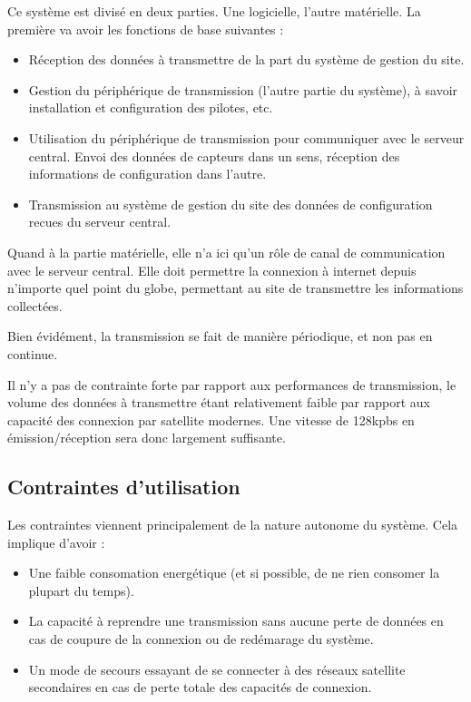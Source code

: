 Ce système est divisé en deux parties. Une logicielle, l'autre matérielle. La première va avoir les fonctions de base suivantes :

\begin{itemize}
\item Réception des données à transmettre de la part du système de gestion du site.
\item Gestion du périphérique de transmission (l'autre partie du système), à savoir installation et configuration des pilotes, etc.
\item Utilisation du périphérique de transmission pour communiquer avec le serveur central. Envoi des données de capteurs dans un sens, réception des informations de configuration dans l'autre.
\item Transmission au système de gestion du site des données de configuration recues du serveur central.
\end{itemize}

Quand à la partie matérielle, elle n'a ici qu'un rôle de canal de communication avec le serveur central. Elle doit permettre la connexion à internet depuis n'importe quel point du globe, permettant au site de transmettre les informations collectées.

Bien évidément, la transmission se fait de manière périodique, et non pas en continue.

Il n'y a pas de contrainte forte par rapport aux performances de transmission, le volume des données à transmettre étant relativement faible par rapport aux capacité des connexion par satellite modernes. Une vitesse de 128kpbs en émission/réception sera donc largement suffisante.

\subsection{Contraintes d'utilisation}

Les contraintes viennent principalement de la nature autonome du système. Cela implique d'avoir :

\begin{itemize}
\item Une faible consomation energétique (et si possible, de ne rien consomer la plupart du temps).
\item La capacité à reprendre une transmission sans aucune perte de données en cas de coupure de la connexion ou de redémarage du système.
\item Un mode de secours essayant de se connecter à des réseaux satellite secondaires en cas de perte totale des capacités de connexion.
\end{itemize}

